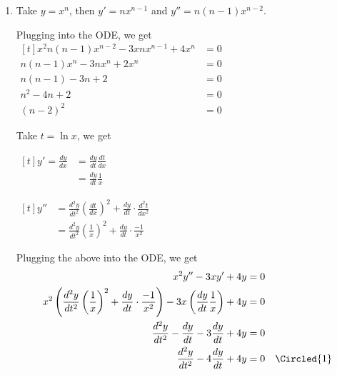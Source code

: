 \documentclass[11pt,fleqn]{book} %
\begin{document}
\begin{enumerate}
    \item Take $y = x^n$, then $y' = nx^{n-1}$ and $y'' = n(n-1)x^{n-2}$. 
    
    Plugging into the ODE, we get $\begin{aligned}[t]
        x^2n(n - 1)x^{n-2} - 3xnx^{n-1} + 4x^n & = 0 \\
        n(n - 1)x^n - 3nx^n + 2x^n             & = 0 \\
        n(n-1) - 3n + 2                        & = 0 \\
        n^2 - 4n + 2                           & = 0 \\
        (n - 2)^2                              & = 0
    \end{aligned}$

    Take $t = \ln x$, we get 

    \begin{minipage}[t]{0.45\linewidth}
        $\begin{aligned}[t]
            y' = \frac{dy}{dx} & = \frac{dy}{dt} \frac{dt}{dx} \\
                               & = \frac{dy}{dt} \frac{1}{x}
        \end{aligned}$
    \end{minipage}
    \begin{minipage}[t]{0.45\linewidth}
        $\begin{aligned}[t]
            y'' 
            & = \frac{d^2y}{dt^2}\left( \frac{dt}{dx} \right)^2 + \frac{dy}{dt} \cdot \frac{d^2t}{dx^2} \\
            &= \frac{d^2y}{dt^2} \left( \frac{1}{x} \right)^2 + \frac{dy}{dt} \cdot \frac{-1}{x^2}
        \end{aligned}$
    \end{minipage}

    Plugging the above into the ODE, we get 
    \begin{align*}
        x^2y'' - 3xy' + 4y & = 0 \\
        x^2 \left( \frac{d^2y}{dt^2} \left( \frac{1}{x} \right)^2 + \frac{dy}{dt} \cdot \frac{-1}{x^2} \right) - 3x \left( \frac{dy}{dt} \frac{1}{x} \right) + 4y & = 0 \\
        \frac{d^2y}{dt^2} - \frac{dy}{dt} - 3\frac{dy}{dt} + 4y & = 0 \\
        \frac{d^2y}{dt^2} - 4\frac{dy}{dt} + 4y & = 0 & \Circled{1}
    \end{align*}


\end{enumerate}
\end{document}
